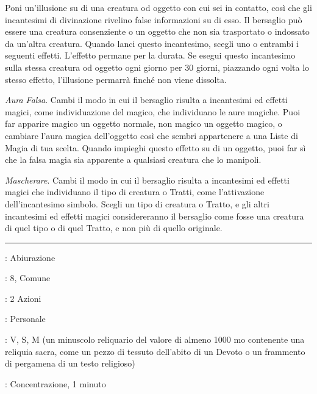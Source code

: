 \begin{multicols}{2}
Poni un'illusione su di una creatura od oggetto con cui sei in contatto, così che gli incantesimi di divinazione rivelino false informazioni su di esso. Il bersaglio può essere una creatura consenziente o un oggetto che non sia trasportato o indossato da un'altra creatura. Quando lanci questo incantesimo, scegli uno o entrambi i seguenti effetti. L'effetto permane per la durata. Se esegui questo incantesimo sulla stessa creatura od oggetto ogni giorno per 30 giorni, piazzando ogni volta lo stesso effetto, l'illusione permarrà finché non viene dissolta.

\emph{Aura Falsa}. Cambi il modo in cui il bersaglio risulta a incantesimi ed effetti magici, come individuazione del magico, che individuano le aure magiche. Puoi far apparire magico un oggetto normale, non magico un oggetto magico, o cambiare l'aura magica dell'oggetto così che sembri appartenere a una Liste di Magia di tua scelta. Quando impieghi questo effetto su di un oggetto, puoi far sì che la falsa magia sia apparente a qualsiasi creatura che lo manipoli.

\emph{Mascherare}. Cambi il modo in cui il bersaglio risulta a incantesimi ed effetti magici che individuano il tipo di creatura o Tratti, come l'attivazione dell'incantesimo simbolo. Scegli un tipo di creatura o Tratto, e gli altri incantesimi ed effetti magici considereranno il bersaglio come fosse una creatura di quel tipo o di quel Tratto, e non più di quello originale.

\smallskip\noindent\rule{\linewidth}{2pt} \hypertarget{Aura Sacra}{}\smallskip{}
\noindent
\begin{description}[noitemsep, topsep=0pt, parsep=0pt, partopsep=0pt, leftmargin=0cm, labelwidth=2.8cm]
	\item[\textbf{Lista di Magia}]: Abiurazione
	\item[\textbf{Livello}]: 8, Comune
	\item[\textbf{T. di Lancio}]: 2 Azioni
	\item[\textbf{Gittata}]: Personale
	\item[\textbf{Componenti}]: V, S, M (un minuscolo reliquario del valore di almeno 1000 mo contenente una reliquia sacra, come un pezzo di tessuto dell'abito di un Devoto o un frammento di pergamena di un testo religioso)
	\item[\textbf{Durata}]: Concentrazione, 1 minuto
\end{description}


\end{multicols}
